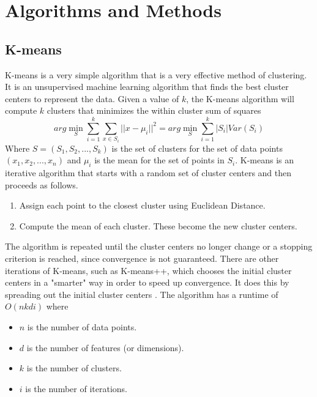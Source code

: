 \documentclass[12pt]{extarticle}
\begin{document}
\section{Algorithms and Methods}

  \subsection{K-means}
    K-means is a very simple algorithm that is a very effective method of clustering.
    It is an unsupervised machine learning algorithm that finds the best cluster
    centers to represent the data. Given a value of $k$, the K-means algorithm
    will compute $k$ clusters that minimizes the within cluster sum of squares
    \begin{equation}
      arg \min_{S} \sum_{i=1}^{k} \sum_{x\in S_i} ||x-\mu_i||^2
      = arg \min_{S} \sum_{i=1}^{k} |S_i| Var(S_i)
    \end{equation}
    Where $S=(S_1,S_2,...,S_k)$ is the set of clusters for the set of data points
    $(x_1,x_2,...,x_n)$ and $\mu_i$ is the mean for the set of points in $S_i$.
    K-means is an iterative algorithm that starts with a random set of cluster
    centers and then proceeds as follows.
    \begin{enumerate}
      \item Assign each point to the closest cluster using Euclidean Distance.
      \item Compute the mean of each cluster. These become the new cluster
        centers.
    \end{enumerate}
    The algorithm is repeated until the cluster centers no longer change or
    a stopping criterion is reached, since convergence is not guaranteed.
    There are other iterations of K-means, such as K-means++, which chooses
    the initial cluster centers in a "smarter" way in order to speed up
    convergence. It does this by spreading out the initial cluster centers
    \cite{kmeans}. The algorithm has a runtime of $O(nkdi)$ where
    \begin{itemize}
      \item $n$ is the number of data points.
      \item $d$ is the number of features (or dimensions).
      \item $k$ is the number of clusters.
      \item $i$ is the number of iterations.
    \end{itemize}
\end{document}

